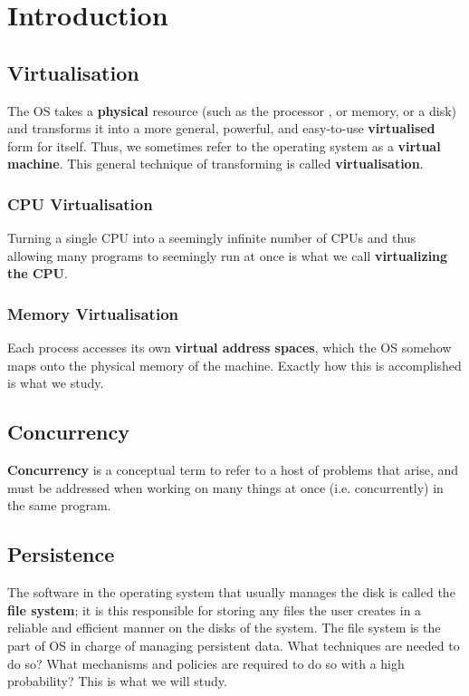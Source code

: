 \chapter{Introduction}

\section{Virtualisation}

The OS takes a \textbf{physical} resource (such as the processor
, or memory, or a disk) and transforms it into a more general,
powerful, and easy-to-use \textbf{virtualised} form for itself. Thus,
we sometimes refer to the operating system as a \textbf{virtual
machine}. This general technique of transforming is called
\textbf{virtualisation}.

\subsection{CPU Virtualisation}

Turning a single CPU into a seemingly infinite number of CPUs and
thus allowing many programs to seemingly run at once is what
we call \textbf{virtualizing the CPU}.\\

\subsection{Memory Virtualisation}

Each process accesses its own \textbf{virtual address spaces}, which
the OS somehow maps onto the physical memory of the machine. Exactly
how this is accomplished is what we study.

\section{Concurrency}

\textbf{Concurrency} is a conceptual term to refer to a host of 
problems that arise, and must be addressed when working on
many things at once (i.e. concurrently) in the same program.

\section{Persistence}

The software in the operating system that usually manages the disk
is called the \textbf{file system}; it is this
responsible for storing any
files the user creates in a reliable and efficient manner on the 
disks of the system. The file system is the part of OS in charge
of managing persistent data. What techniques are needed to do so? 
What mechanisms and policies are required to do so with a high
probability? This is what we will study.
